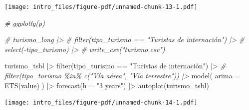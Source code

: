\documentclass[
  letterpaper,
  DIV=11,
  numbers=noendperiod]{scrartcl}
\newenvironment{Shaded}{}{}
\newcommand{\AttributeTok}[1]{\textcolor[rgb]{0.65,0.15,0.64}{#1}}
\newcommand{\CommentTok}[1]{\textcolor[rgb]{0.63,0.63,0.65}{\textit{#1}}}
\newcommand{\FunctionTok}[1]{\textcolor[rgb]{0.25,0.47,0.95}{#1}}
\newcommand{\NormalTok}[1]{\textcolor[rgb]{0.22,0.23,0.26}{#1}}
\newcommand{\SpecialCharTok}[1]{\textcolor[rgb]{0.00,0.52,0.74}{#1}}
\newcommand{\StringTok}[1]{\textcolor[rgb]{0.31,0.63,0.31}{#1}}
\begin{document}
\texttt{[image: intro\_files/figure-pdf/unnamed-chunk-13-1.pdf]}

\begin{Shaded}
\begin{Highlighting}[]
\CommentTok{\# ggplotly(p)}
\end{Highlighting}
\end{Shaded}

\begin{Shaded}
\begin{Highlighting}[]
\CommentTok{\# turismo\_long |\textgreater{} }
\CommentTok{\#   filter(tipo\_turismo == "Turistas de internación") |\textgreater{} }
\CommentTok{\#   select({-}tipo\_turismo) |\textgreater{} }
\CommentTok{\#   write\_csv("turismo.csv")}

\NormalTok{turismo\_tsbl }\SpecialCharTok{|\textgreater{}} 
  \FunctionTok{filter}\NormalTok{(tipo\_turismo }\SpecialCharTok{==} \StringTok{"Turistas de internación"}\NormalTok{) }\SpecialCharTok{|\textgreater{}} 
  \CommentTok{\# filter(tipo\_turismo \%in\% c("Vía aérea", "Vía terrestre")) |\textgreater{} }
  \FunctionTok{model}\NormalTok{(}
    \AttributeTok{arima =} \FunctionTok{ETS}\NormalTok{(value)}
\NormalTok{  ) }\SpecialCharTok{|\textgreater{}} 
  \FunctionTok{forecast}\NormalTok{(}\AttributeTok{h =} \StringTok{"3 years"}\NormalTok{) }\SpecialCharTok{|\textgreater{}} 
  \FunctionTok{autoplot}\NormalTok{(turismo\_tsbl)}
\end{Highlighting}
\end{Shaded}

\texttt{[image: intro\_files/figure-pdf/unnamed-chunk-14-1.pdf]}
\end{document}
